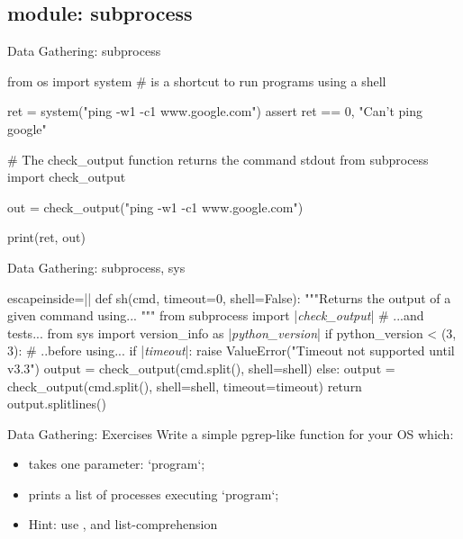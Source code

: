 \subsection{module: subprocess}
\begin{pyframe}{Data Gathering: subprocess}
\begin{pycode}
from os import system # is a shortcut to run programs using a shell

ret = system("ping -w1 -c1 www.google.com")
assert ret == 0, "Can't ping google"

# The check_output function returns the command stdout
from subprocess import check_output

out = check_output("ping -w1 -c1 www.google.com")

print(ret, out)
\end{pycode}
\end{pyframe}

\begin{pyframe}{Data Gathering: subprocess, sys}
\begin{pycode*}{escapeinside=||}
def sh(cmd, timeout=0, shell=False):
    """Returns the output of a given command using... """
    from subprocess import |\emph{check\_output}| # ...and tests...
    from sys import version_info as |\emph{python\_version}|
    if python_version < (3, 3): # ..before using...
      if |\emph{timeout}|:
        raise ValueError("Timeout not supported until v3.3")
      output = check_output(cmd.split(), shell=shell)
    else:
      output = check_output(cmd.split(), shell=shell, timeout=timeout)
    return output.splitlines()
    
    
    
\end{pycode*}
\end{pyframe}

\begin{pyframe}{Data Gathering: Exercises}
Write a simple pgrep-like function for your OS which:
\begin{itemize}
\item takes one parameter: `program`;
\item prints a list of processes executing `program`;
\item Hint: use , and list-comprehension
\end{itemize}
\end{pyframe}


